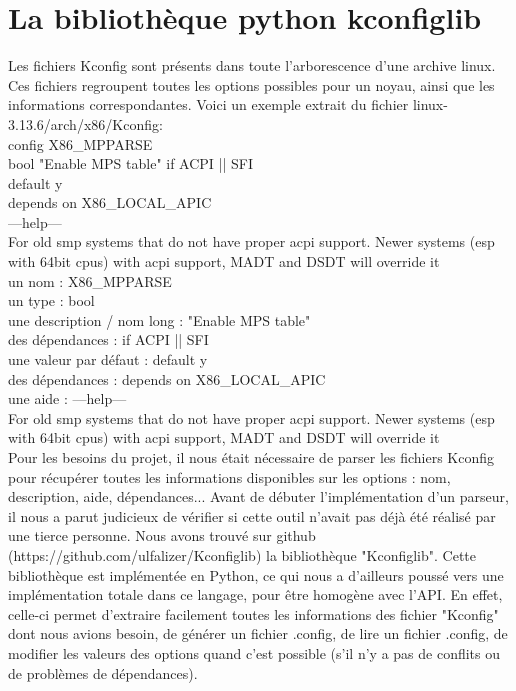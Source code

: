 \documentclass[16pts]{report}
\begin{document}
    \section{La bibliothèque python kconfiglib}
    \label{sec:La bibliothèque python kconfiglib}
    
    Les fichiers Kconfig sont présents dans toute l'arborescence d'une archive linux.
    Ces fichiers regroupent toutes les options possibles pour un noyau, ainsi que 
    les informations correspondantes. 
    Voici un exemple extrait du fichier linux-3.13.6/arch/x86/Kconfig: \\

    config X86\_MPPARSE\\
        bool "Enable MPS table" if ACPI || SFI\\
        default y\\
        depends on X86\_LOCAL\_APIC\\
        ---help---\\
          For old smp systems that do not have proper acpi support. Newer systems
          (esp with 64bit cpus) with acpi support, MADT and DSDT will override it\\

    un nom : X86\_MPPARSE\\
    un type : bool\\
    une description / nom long : "Enable MPS table"\\
    des dépendances : if ACPI || SFI\\
    une valeur par défaut : default y\\
    des dépendances : depends on X86\_LOCAL\_APIC\\
    une aide : ---help---\\
        For old smp systems that do not have proper acpi support. Newer systems
        (esp with 64bit cpus) with acpi support, MADT and DSDT will override it\\

    Pour les besoins du projet, il nous était nécessaire de parser les fichiers 
    Kconfig pour récupérer toutes les informations disponibles sur les options : nom,
    description, aide, dépendances... Avant de débuter l'implémentation d'un 
    parseur, il nous a parut judicieux de vérifier si cette 
    outil n'avait pas déjà été réalisé par une tierce personne.
    Nous avons trouvé sur github (https://github.com/ulfalizer/Kconfiglib) la 
    bibliothèque "Kconfiglib". Cette bibliothèque est implémentée en Python, ce qui 
    nous a d'ailleurs poussé vers une implémentation totale dans ce langage, pour 
    être homogène avec l'API. En effet, celle-ci permet d'extraire facilement toutes 
    les informations des fichier "Kconfig" dont nous avions besoin, de générer un 
    fichier .config, de lire un fichier .config, de modifier les valeurs des options
    quand c'est possible (s'il n'y a pas de conflits ou de problèmes de dépendances).\\
\end{document}
